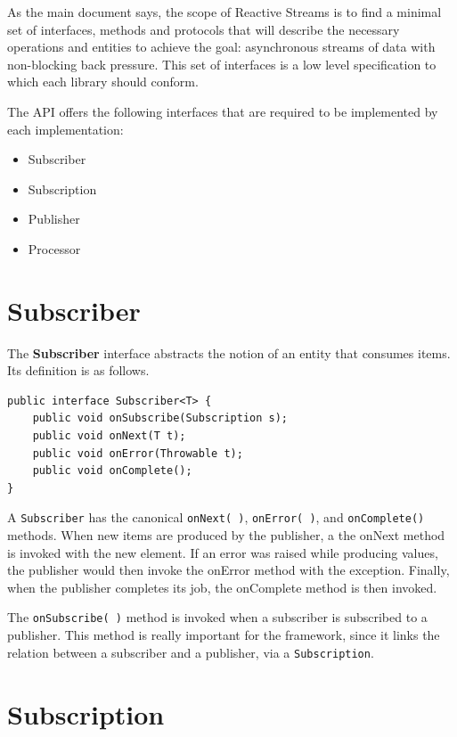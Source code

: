 As the main document says, the scope of Reactive Streams is to find a
minimal set of interfaces, methods and protocols that will describe the
necessary operations and entities to achieve the goal: asynchronous
streams of data with non-blocking back pressure. This set of interfaces
is a low level specification to which each library should conform.

The API offers the following interfaces that are required to be
implemented by each implementation:

\begin{itemize}
\itemsep1pt\parskip0pt
\item
  Subscriber
\item
  Subscription
\item
  Publisher
\item
  Processor
\end{itemize}


\section{Subscriber}\label{subscriber}

The \textbf{Subscriber} interface abstracts the notion of an entity that
consumes items. Its definition is as follows.

\begin{verbatim}
public interface Subscriber<T> {
    public void onSubscribe(Subscription s);
    public void onNext(T t);
    public void onError(Throwable t);
    public void onComplete();
}
\end{verbatim}

A \texttt{Subscriber} has the canonical \texttt{onNext(\ )},
\texttt{onError(\ )}, and \texttt{onComplete()} methods. When new items
are produced by the publisher, a the onNext method is invoked with the
new element. If an error was raised while producing values, the
publisher would then invoke the onError method with the exception.
Finally, when the publisher completes its job, the onComplete method is
then invoked.

The \texttt{onSubscribe(\ )} method is invoked when a subscriber is
subscribed to a publisher. This method is really important for the
framework, since it links the relation between a subscriber and a
publisher, via a \texttt{Subscription}.

\section{Subscription}\label{subscription}

